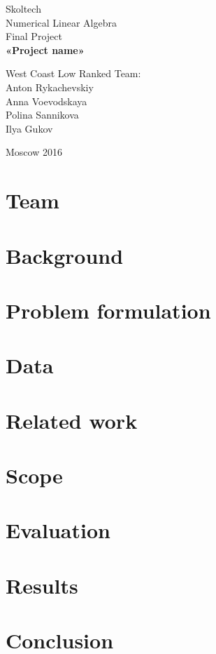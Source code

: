 \documentclass[12pt,a4paper]{article}
\begin{document}
	\begin{titlepage}
		\begin{center}
			\small
			Skoltech \\
			\vspace{10cm} 
			Numerical Linear Algebra\\
			Final Project\\
			\textbf{
				\large
				«Project name»}
		\end{center}
		\vspace{8.5cm} 
		\small	
		\begin{flushright}
			West Coast Low Ranked Team:\\
			Anton Rykachevskiy\\
			Anna Voevodskaya\\
			Polina Sannikova\\
			Ilya Gukov\\
			
		\end{flushright}
		\vspace{\fill}
		
		\begin{center}
			Moscow 2016
		\end{center}
	\end{titlepage}
	
	\newpage
	
	\tableofcontents
	\newpage
	\section{Team}
	\section{Background}
	\section{Problem formulation}
	\section{Data}
	\section{Related work}
	\section{Scope}
	\section{Evaluation}
	\section{Results}
	\section{Conclusion}
	\clearpage
	\begin{thebibliography}{99}
		
		\end{thebibliography}
\end{document}
